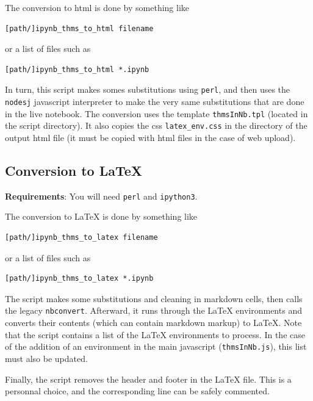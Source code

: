The conversion to html is done by something like

\begin{verbatim}
[path/]ipynb_thms_to_html filename
\end{verbatim}

or a list of files such as

\begin{verbatim}
[path/]ipynb_thms_to_html *.ipynb
\end{verbatim}

In turn, this script makes somes substitutions using \texttt{perl}, and
then uses the \texttt{nodesj} javascript interpreter to make the very
same substitutions that are done in the live notebook. The conversion
uses the template \texttt{thmsInNb.tpl} (located in the script
directory). It also copies the css \texttt{latex\_env.css} in the
directory of the output html file (it must be copied with html files in
the case of web upload).

    \subsection{Conversion to LaTeX}\label{conversion-to-latex}

    \textbf{Requirements}: You will need \texttt{perl} and
\texttt{ipython3}.

The conversion to LaTeX is done by something like

\begin{verbatim}
[path/]ipynb_thms_to_latex filename
\end{verbatim}

or a list of files such as

\begin{verbatim}
[path/]ipynb_thms_to_latex *.ipynb

\end{verbatim}

The script makes some substitutions and cleaning in markdown cells, then
calls the legacy \texttt{nbconvert}. Afterward, it runs through the
LaTeX environments and converts their contents (which can contain
markdown markup) to LaTeX. Note that the script contains a list of the
LaTeX environments to process. In the case of the addition of an
environment in the main javascript (\texttt{thmsInNb.js}), this list
must also be updated.

Finally, the script removes the header and footer in the LaTeX file.
This is a personnal choice, and the corresponding line can be safely
commented.

